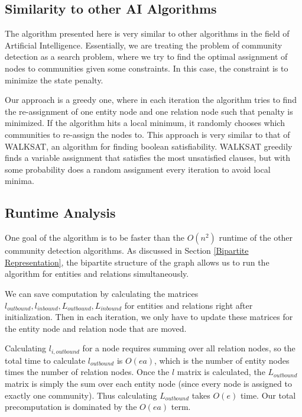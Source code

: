 \documentclass[12pt]{article}
\begin{document}
\subsection{Similarity to other AI Algorithms}
\label{Similarity to other AI Algorithms}

The algorithm presented here is very similar to other algorithms in the field of
Artificial Intelligence. Essentially, we are treating the problem of community
detection as a search problem, where we try to find the optimal assignment
of nodes to communities given some constraints. In this case, the constraint is
to minimize the state penalty.

Our approach is a greedy one, where in each iteration the algorithm tries to
find the re-assignment of one entity node and one relation node such that
penalty is minimized. If the algorithm hits a local minimum, it randomly chooses
which communities to re-assign the nodes to. This approach is very similar to
that of  WALKSAT, an algorithm for finding boolean satisfiability. WALKSAT
greedily finds a variable assignment that satisfies the most unsatisfied
clauses, but with some probability does a random assignment every iteration to
avoid local minima.

\subsection{Runtime Analysis}
\label{Runtime Analysis}

One goal of the algorithm is to be faster than the $O(n^2)$ runtime of the
other community detection algorithms\cite{ohai}\cite{other}. As discussed in
Section \ref{Bipartite Representation}, the bipartite structure of the graph
allows us to run the algorithm for entities and relations simultaneously.

We can save computation by calculating the matrices $l_{outbound}, l_{inbound},
L_{outbound}, L_{inbound}$ for entities and relations right after
initialization. Then in each iteration, we only have to update these matrices
for the entity node and relation node that are moved.

Calculating $l_{i, outbound}$ for a node requires summing over all relation
nodes, so the total time to calculate $l_{outbound}$ is $O(ea)$, which is the
number of entity nodes times the number of relation nodes. Once the $l$ matrix
is calculated, the $L_{outbound}$ matrix is simply the sum over each entity node
(since every node is assigned to exactly one community). Thus calculating
$L_{outbound}$ takes $O(e)$ time. Our total precomputation is dominated by the
$O(ea)$ term.
\end{document}
